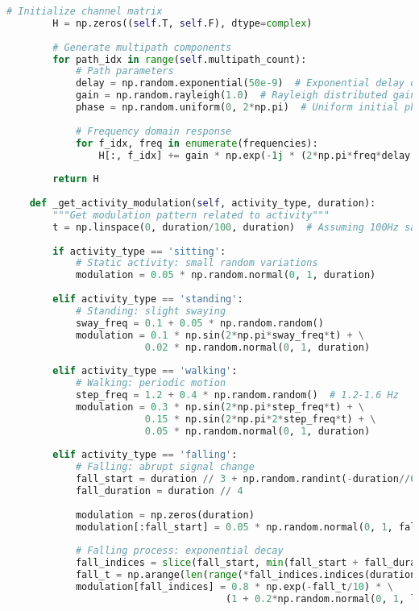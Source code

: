 \begin{lstlisting}[language=Python,caption=Core Implementation of Synthetic Data Generator]
        # Initialize channel matrix
        H = np.zeros((self.T, self.F), dtype=complex)
        
        # Generate multipath components
        for path_idx in range(self.multipath_count):
            # Path parameters
            delay = np.random.exponential(50e-9)  # Exponential delay distribution
            gain = np.random.rayleigh(1.0)  # Rayleigh distributed gain
            phase = np.random.uniform(0, 2*np.pi)  # Uniform initial phase distribution
            
            # Frequency domain response
            for f_idx, freq in enumerate(frequencies):
                H[:, f_idx] += gain * np.exp(-1j * (2*np.pi*freq*delay + phase))
        
        return H
    
    def _get_activity_modulation(self, activity_type, duration):
        """Get modulation pattern related to activity"""
        t = np.linspace(0, duration/100, duration)  # Assuming 100Hz sampling rate
        
        if activity_type == 'sitting':
            # Static activity: small random variations
            modulation = 0.05 * np.random.normal(0, 1, duration)
            
        elif activity_type == 'standing':
            # Standing: slight swaying
            sway_freq = 0.1 + 0.05 * np.random.random()
            modulation = 0.1 * np.sin(2*np.pi*sway_freq*t) + \
                        0.02 * np.random.normal(0, 1, duration)
            
        elif activity_type == 'walking':
            # Walking: periodic motion
            step_freq = 1.2 + 0.4 * np.random.random()  # 1.2-1.6 Hz
            modulation = 0.3 * np.sin(2*np.pi*step_freq*t) + \
                        0.15 * np.sin(2*np.pi*2*step_freq*t) + \
                        0.05 * np.random.normal(0, 1, duration)
            
        elif activity_type == 'falling':
            # Falling: abrupt signal change
            fall_start = duration // 3 + np.random.randint(-duration//6, duration//6)
            fall_duration = duration // 4
            
            modulation = np.zeros(duration)
            modulation[:fall_start] = 0.05 * np.random.normal(0, 1, fall_start)
            
            # Falling process: exponential decay
            fall_indices = slice(fall_start, min(fall_start + fall_duration, duration))
            fall_t = np.arange(len(range(*fall_indices.indices(duration))))
            modulation[fall_indices] = 0.8 * np.exp(-fall_t/10) * \
                                      (1 + 0.2*np.random.normal(0, 1, len(fall_t)))
            

\end{lstlisting}
